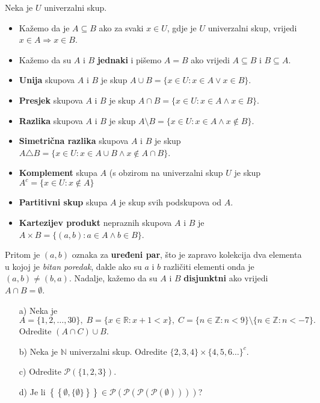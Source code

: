 \begin{definition} Neka je $U$ univerzalni skup.
\begin{itemize}
\item Kažemo da je $A\subseteq B$ ako za svaki $x\in U$, gdje je $U$ univerzalni skup, vrijedi $x\in A\Rightarrow x\in B$.
\item Kažemo da su $A$ i $B$ \textbf{jednaki} i pišemo $A=B$ ako vrijedi $A\subseteq B$ i $B\subseteq A$.
\item \textbf{Unija} skupova $A$ i $B$ je skup $A\cup B=\{x\in U : x\in A\vee x\in B\}$.
\item \textbf{Presjek} skupova $A$ i $B$ je skup $A\cap B=\{x\in U : x\in A\wedge x\in B\}$.
\item \textbf{Razlika} skupova $A$ i $B$ je skup $A\setminus B=\{x\in U : x\in A\wedge x\notin B\}$.
\item \textbf{Simetrična razlika} skupova $A$ i $B$ je skup $A\triangle B=\{x\in U : x\in A\cup B \wedge x\notin A\cap B\}$.
\item \textbf{Komplement} skupa $A$ (s obzirom na univerzalni skup $U$ je skup $A^c=\{x\in U : x\notin A\}$
\item \textbf{Partitivni skup} skupa $A$ je skup svih podskupova od $A$.
\item \textbf{Kartezijev produkt} nepraznih skupova $A$ i $B$ je $A\times B=\{(a, b) : a\in A \wedge b\in B\}$.
\end{itemize}
Pritom je $(a, b)$ oznaka za \textbf{uređeni par}, što je zapravo kolekcija dva elementa u kojoj je \textit{bitan poredak}, dakle ako su $a$ i $b$ različiti elementi onda je $(a, b)\neq (b, a)$. Nadalje, kažemo da su $A$ i $B$ \textbf{disjunktni} ako vrijedi $A\cap B=\emptyset$.
\end{definition}
\begin{exercise} \textbf{}
\begin{itemize}
\item[a)] Neka je $$A=\{1, 2, \dots, 30\},\; B=\{x\in \mathbb{R} : x+1<x\},\; C=\{n\in \mathbb{Z} : n<9\}\setminus\{n \in \mathbb{Z} : n<-7\}.$$ 
Odredite $(A\cap C)\cup B$.
\item[b)] Neka je $\mathbb{N}$ univerzalni skup. Odredite $\{2, 3, 4\}\times \{4, 5, 6 \dots\}^c$.
\item[c)] Odredite $\mathcal{P}\left(\{1, 2, 3\}\right)$.
\item[d)] Je li $\left\{\left\{\emptyset, \{\emptyset\}\right\}\right\} \in \mathcal{P}\left(\mathcal{P}\left(\mathcal{P}\left(\mathcal{P}\left(\emptyset\right)\right)\right)\right)$?
\end{itemize}
\end{exercise}
